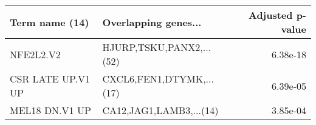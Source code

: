 \begin{tabular}{llr}
\toprule
   Term name (14) &     Overlapping genes... &  Adjusted p-value \\
\midrule
        NFE2L2.V2 & HJURP,TSKU,PANX2,...(52) &          6.38e-18 \\
CSR LATE UP.V1 UP & CXCL6,FEN1,DTYMK,...(17) &          6.39e-05 \\
   MEL18 DN.V1 UP &  CA12,JAG1,LAMB3,...(14) &          3.85e-04 \\
\bottomrule
\end{tabular}
